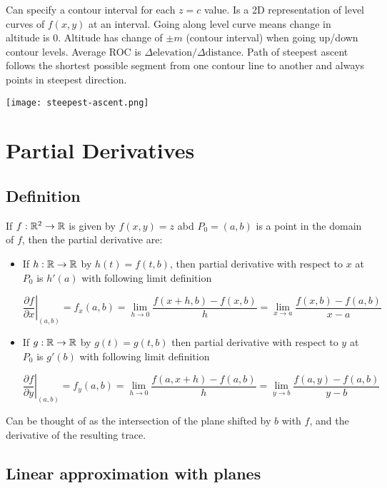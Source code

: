 Can specify a contour interval for each $z=c$ value. Is a 2D representation of
level curves of $f(x,y)$ at an interval. Going along level curve means change in altitude is
0. Altitude has change of $\pm m$ (contour interval) when going up/down contour levels. Average ROC is $\Delta \text{elevation}/\Delta \text{distance}$.
Path of steepest ascent follows the shortest possible segment from one contour line to another and always points in steepest direction.

\begin{center}
    \texttt{[image: steepest-ascent.png]}
\end{center}

\section{Partial Derivatives}

\subsection{Definition}

If $f:\mathbb{R}^2\rightarrow \mathbb{R}$ is given by $f(x,y)=z$ abd $P_0=(a,b)$ is a point in the domain of $f$,
then the partial derivative are:
\begin{itemize}
    \item If $h:\mathbb{R}\rightarrow \mathbb{R}$ by $h(t)=f(t,b)$, then partial derivative with respect to $x$ at $P_0$
    is $h'(a)$ with following limit definition

    \[\left.\frac{\partial f}{\partial x}\right|_{(a, b)}=f_{x}(a, b)=\lim _{h \rightarrow 0} \frac{f(x+h, b)-f(x, b)}{h}=\lim _{x \rightarrow a} \frac{f(x, b)-f(a, b)}{x-a}\]

    \item If $g:\mathbb{R}\rightarrow \mathbb{R}$ by $g(t)=g(t,b)$ then partial derivative with respect to $y$ at $P_0$ is $g'(b)$ with following limit definition
    
    \[\left.\frac{\partial f}{\partial y}\right|_{(a, b)}=f_{y}(a, b)=\lim _{h \rightarrow 0} \frac{f(a, x+h)-f(a, b)}{h}=\lim _{y \rightarrow b} \frac{f(a, y)-f(a, b)}{y-b}\]

\end{itemize}

Can be thought of as the intersection of the plane shifted by $b$ with $f$, and the derivative of the resulting trace.

\subsection{Linear approximation with planes}

